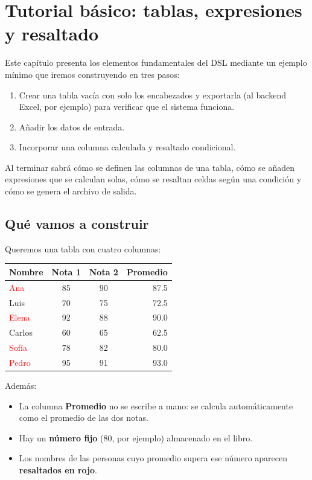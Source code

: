 \documentclass[12pt,a4paper]{report}
\begin{document}
\chapter{Tutorial básico: tablas, expresiones y resaltado}
\label{cap:tutorial-basico}

Este capítulo presenta los elementos fundamentales del DSL mediante un
ejemplo mínimo que iremos construyendo en tres pasos:

\begin{enumerate}
  \item Crear una tabla vacía con solo los encabezados y exportarla
    (al backend Excel, por ejemplo) para verificar que el sistema
    funciona.
  \item Añadir los datos de entrada.
  \item Incorporar una columna calculada y resaltado condicional.
\end{enumerate}

Al terminar sabrá cómo se definen las columnas de una tabla, cómo se
añaden expresiones que se calculan solas, cómo se resaltan celdas según
una condición y cómo se genera el archivo de salida.

\section{Qué vamos a construir}

Queremos una tabla con cuatro columnas:

\begin{center}
\begin{tabular}{|l|c|c|r|}
\toprule
\textbf{Nombre} & \textbf{Nota 1} & \textbf{Nota 2} & \textbf{Promedio} \\
\midrule
\textcolor{red}{Ana}    & 85 & 90 & 87.5 \\
Luis   & 70 & 75 & 72.5 \\
\textcolor{red}{Elena}  & 92 & 88 & 90.0 \\
Carlos & 60 & 65 & 62.5 \\
\textcolor{red}{Sofía}  & 78 & 82 & 80.0 \\
\textcolor{red}{Pedro}  & 95 & 91 & 93.0 \\
\bottomrule
\end{tabular}
\end{center}

Además:
\begin{itemize}
  \item La columna \textbf{Promedio} no se escribe a mano: se calcula
    automáticamente como el promedio de las dos notas.
  \item Hay un \textbf{número fijo} (80, por ejemplo) almacenado en el
    libro.
  \item Los nombres de las personas cuyo promedio supera ese número
    aparecen \textbf{resaltados en rojo}.
\end{itemize}
\end{document}
